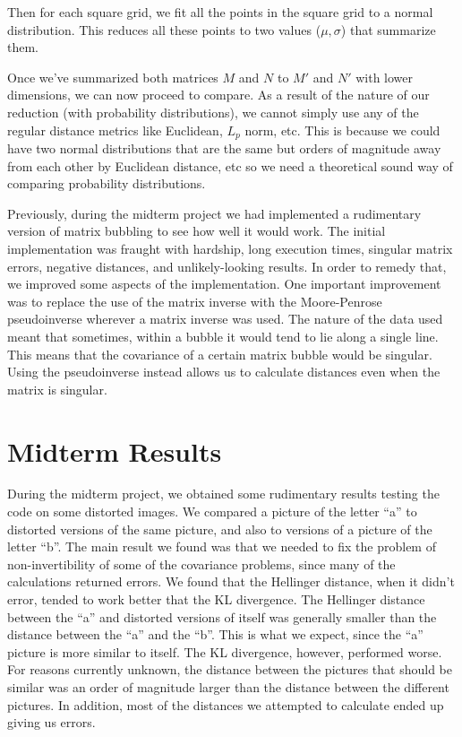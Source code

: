 \documentclass{article}
\begin{document}
Then for each square grid, we fit all the points in the square grid to a normal
distribution. This reduces all these points to two values ($\mu, \sigma$) that
summarize them.

Once we've summarized both matrices $M$ and $N$ to $M'$ and $N'$ with lower
dimensions, we can now proceed to compare. As a result of the nature of our
reduction (with probability distributions), we cannot simply use any of the
regular distance metrics like Euclidean, $L_p$ norm, etc. This is because we
could have two normal distributions that are the same but orders of magnitude
away from each other by Euclidean distance, etc so we need a theoretical sound
way of comparing probability distributions.

Previously, during the midterm project we had implemented a rudimentary version
of matrix bubbling to see how well it would work. The initial implementation
was fraught with hardship, long execution times, singular matrix errors,
negative distances, and unlikely-looking results. In order to remedy that, we
improved some aspects of the implementation. One important improvement was to
replace the use of the matrix inverse with the Moore-Penrose pseudoinverse
wherever a matrix inverse was used. The nature of the data used meant that
sometimes, within a bubble it would tend to lie along a single line. This means
that the covariance of a certain matrix bubble would be singular. Using the
pseudoinverse instead allows us to calculate distances even when the matrix is
singular.

\section{Midterm Results}

During the midterm project, we obtained some rudimentary results testing the
code on some distorted images. We compared a picture of the letter ``a'' to
distorted versions of the same picture, and also to versions of a picture of
the letter ``b''. The main result we found was that we needed to fix the
problem of non-invertibility of some of the covariance problems, since many of
the calculations returned errors. We found that the Hellinger distance, when it
didn't error, tended to work better that the KL divergence. The Hellinger
distance between the ``a'' and distorted versions of itself was generally
smaller than the distance between the ``a'' and the ``b''. This is what we
expect, since the ``a'' picture is more similar to itself. The KL divergence,
however, performed worse. For reasons currently unknown, the distance between
the pictures that should be similar was an order of magnitude larger than the
distance between the different pictures. In addition, most of the distances we
attempted to calculate ended up giving us errors.
\end{document}
